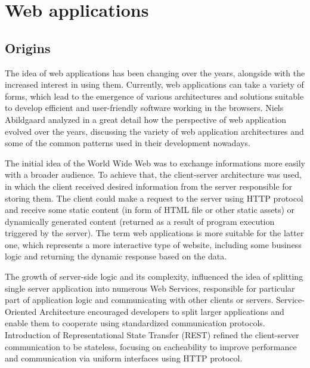 \chapter{Web applications}


\section{Origins}

The idea of web applications has been changing over the years, alongside with the increased interest in using them. Currently, web applications can take a variety of forms, which lead to the emergence of various architectures and solutions suitable to develop efficient and user-friendly software working in the browsers. Niels Abildgaard \cite{PerspectivesOnArchitectureEvolution} analyzed in a great detail how the perspective of web application evolved over the years, discussing the variety of web application architectures and some of the common patterns used in their development nowadays.

The initial idea of the World Wide Web was to exchange informations more easily with a broader audience. To achieve that, the client-server architecture was used, in which the client received desired information from the server responsible for storing them. The client could make a request to the server using HTTP protocol and receive some static content (in form of HTML file or other static assets) or dynamically generated content (returned as a result of program execution triggered by the server). The term web applications is more suitable for the latter one, which represents a more interactive type of website, including some business logic and returning the dynamic response based on the data.

The growth of server-side logic and its complexity, influenced the idea of splitting single server application into numerous Web Services, responsible for particular part of application logic and communicating with other clients or servers. Service-Oriented Architecture encouraged developers to split larger applications and enable them to cooperate using standardized communication protocols. Introduction of Representational State Transfer (REST) refined the client-server communication to be stateless, focusing on cacheability to improve performance and communication via uniform  interfaces using HTTP protocol.

